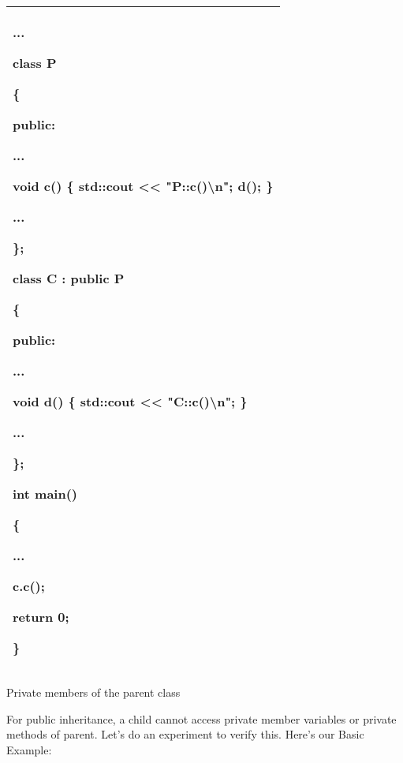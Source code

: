\documentclass[
]{article}
\begin{document}
\begin{longtable}[]{@{}l@{}}
\toprule
\endhead
\begin{minipage}[t]{0.97\columnwidth}\raggedright
...

class P

\{

public:

...

\textbf{void c() \{ std::cout \textless\textless{}
"P::c()\textbackslash n"; d(); \}}

...

\};

class C : public P

\{

public:

...

\textbf{void d() \{ std::cout \textless\textless{}
"C::c()\textbackslash n"; \}}

...

\};

int main()

\{

...

\textbf{c.c();}

return 0;

\}\strut
\end{minipage}\tabularnewline
\bottomrule
\end{longtable}

Private members of the parent class

For public inheritance, a child cannot access private member variables
or private methods of parent. Let's do an experiment to verify this.
Here's our Basic Example:
\end{document}
